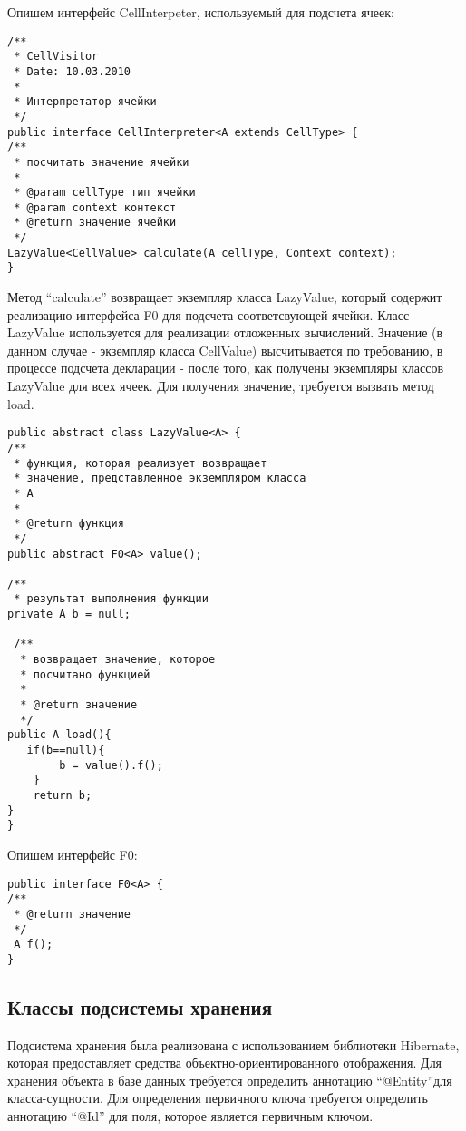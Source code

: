 \documentclass[14pt,a4paper]{reportmod}
\begin{document}
Опишем интерфейс CellInterpeter, используемый для подсчета ячеек:
\begin{small}
\begin{verbatim}
/**
 * CellVisitor
 * Date: 10.03.2010
 *
 * Интерпретатор ячейки
 */
public interface CellInterpreter<A extends CellType> {
/**
 * посчитать значение ячейки
 *
 * @param cellType тип ячейки
 * @param context контекст
 * @return значение ячейки
 */
LazyValue<CellValue> calculate(A cellType, Context context);
}
\end{verbatim}
\end{small}

Метод ``calculate'' возвращает экземпляр класса LazyValue, который содержит реализацию интерфейса F0 для подсчета соответсвующей ячейки. Класс LazyValue используется для реализации отложенных вычислений. Значение (в данном случае - экземпляр класса CellValue) высчитывается по требованию, в процессе подсчета декларации - после того, как получены экземпляры классов LazyValue для всех ячеек. Для получения значение, требуется вызвать метод load.
\begin{small}
\begin{verbatim}
public abstract class LazyValue<A> {
/**
 * функция, которая реализует возвращает
 * значение, представленное экземпляром класса
 * A
 *
 * @return функция
 */
public abstract F0<A> value();

/**
 * результат выполнения функции
private A b = null;

 /**
  * возвращает значение, которое
  * посчитано функцией
  *
  * @return значение
  */
public A load(){
   if(b==null){
        b = value().f();
    }
    return b;
}
}
\end{verbatim}
\end{small}

Опишем интерфейс F0:
\begin{small}
\begin{verbatim}
public interface F0<A> {
/**
 * @return значение
 */
 A f();
}
\end{verbatim}
\end{small}

\subsection{Классы подсистемы хранения}
Подсистема хранения была реализована с использованием библиотеки Hibernate, которая предоставляет средства объектно-ориентированного отображения. Для хранения объекта в базе данных требуется определить аннотацию ``@Entity''для класса-сущности. Для определения первичного ключа требуется определить аннотацию ``@Id'' для поля, которое является первичным ключом.
\end{document}
